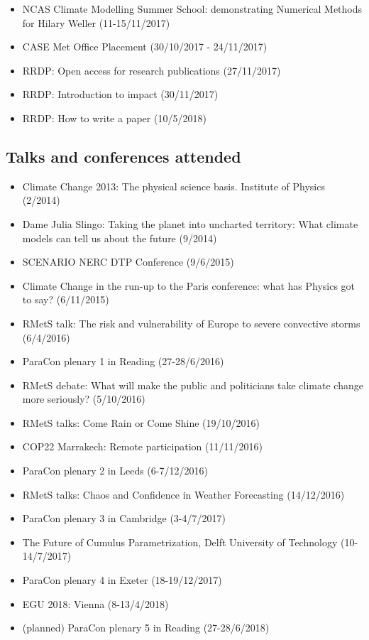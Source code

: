 \documentclass[11pt,a4paper]{article}
\begin{document}
\begin{itemize}
  \item NCAS Climate Modelling Summer School: demonstrating Numerical Methods for Hilary Weller (11-15/11/2017)
  \item CASE Met Office Placement (30/10/2017 - 24/11/2017)
  \item RRDP: Open access for research publications (27/11/2017)
  \item RRDP: Introduction to impact (30/11/2017)
  \item RRDP: How to write a paper (10/5/2018)
\end{itemize}

\subsection*{Talks and conferences attended}

\begin{itemize}
  \item Climate Change 2013: The physical science basis. Institute of Physics (2/2014)
  \item Dame Julia Slingo: Taking the planet into uncharted territory: What climate models can tell us about the future (9/2014)
  \item SCENARIO NERC DTP Conference (9/6/2015)
  \item Climate Change in the run-up to the Paris conference: what has Physics got to say? (6/11/2015)
  \item RMetS talk: The risk and vulnerability of Europe to severe convective storms (6/4/2016)
  \item ParaCon plenary 1 in Reading (27-28/6/2016)
  \item RMetS debate: What will make the public and politicians take climate change more seriously? (5/10/2016)
  \item RMetS talks: Come Rain or Come Shine (19/10/2016)
  \item COP22 Marrakech: Remote participation (11/11/2016)
  \item ParaCon plenary 2 in Leeds (6-7/12/2016)
  \item RMetS talks: Chaos and Confidence in Weather Forecasting (14/12/2016)
  \item ParaCon plenary 3 in Cambridge (3-4/7/2017)
  \item The Future of Cumulus Parametrization, Delft University of Technology (10-14/7/2017)
  \item ParaCon plenary 4 in Exeter (18-19/12/2017)
  \item EGU 2018: Vienna (8-13/4/2018)
  \item (planned) ParaCon plenary 5 in Reading (27-28/6/2018)
\end{itemize}
\end{document}
